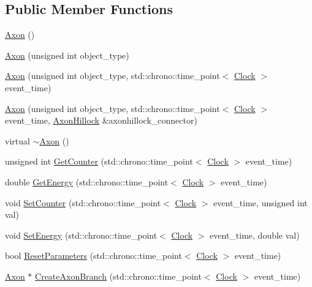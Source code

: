 \subsection*{Public Member Functions}
\begin{DoxyCompactItemize}
\item 
\hyperlink{class_axon_a1a0703b026b74c83e418613d929c5d22}{Axon} ()
\item 
\hyperlink{class_axon_a7cc05238af77735983111d1ca58c9c9b}{Axon} (unsigned int object\+\_\+type)
\item 
\hyperlink{class_axon_a0ca4cd87ad4a2719c6b7c8c3d46dcbc6}{Axon} (unsigned int object\+\_\+type, std\+::chrono\+::time\+\_\+point$<$ \hyperlink{universe_8h_a0ef8d951d1ca5ab3cfaf7ab4c7a6fd80}{Clock} $>$ event\+\_\+time)
\item 
\hyperlink{class_axon_afaffed720efb3cb75e46088c5fb81d95}{Axon} (unsigned int object\+\_\+type, std\+::chrono\+::time\+\_\+point$<$ \hyperlink{universe_8h_a0ef8d951d1ca5ab3cfaf7ab4c7a6fd80}{Clock} $>$ event\+\_\+time, \hyperlink{class_axon_hillock}{Axon\+Hillock} \&axonhillock\+\_\+connector)
\item 
virtual \hyperlink{class_axon_af000507f0ff0527d1743e90d2e756282}{$\sim$\+Axon} ()
\item 
unsigned int \hyperlink{class_axon_a390ff1f3d85034fc85bcafc7374da9c7}{Get\+Counter} (std\+::chrono\+::time\+\_\+point$<$ \hyperlink{universe_8h_a0ef8d951d1ca5ab3cfaf7ab4c7a6fd80}{Clock} $>$ event\+\_\+time)
\item 
double \hyperlink{class_axon_a37a1ca2b0454d77dc0bc93e493feb0ce}{Get\+Energy} (std\+::chrono\+::time\+\_\+point$<$ \hyperlink{universe_8h_a0ef8d951d1ca5ab3cfaf7ab4c7a6fd80}{Clock} $>$ event\+\_\+time)
\item 
void \hyperlink{class_axon_a3493cb97bde26bd66facc6084cd5f219}{Set\+Counter} (std\+::chrono\+::time\+\_\+point$<$ \hyperlink{universe_8h_a0ef8d951d1ca5ab3cfaf7ab4c7a6fd80}{Clock} $>$ event\+\_\+time, unsigned int val)
\item 
void \hyperlink{class_axon_af5108f451de97deb56138e8e81ced359}{Set\+Energy} (std\+::chrono\+::time\+\_\+point$<$ \hyperlink{universe_8h_a0ef8d951d1ca5ab3cfaf7ab4c7a6fd80}{Clock} $>$ event\+\_\+time, double val)
\item 
bool \hyperlink{class_axon_ae079e0b47f5027625da158930e4fa9c5}{Reset\+Parameters} (std\+::chrono\+::time\+\_\+point$<$ \hyperlink{universe_8h_a0ef8d951d1ca5ab3cfaf7ab4c7a6fd80}{Clock} $>$ event\+\_\+time)
\item 
\hyperlink{class_axon}{Axon} $\ast$ \hyperlink{class_axon_a41e97ead4c793003db2de87061574c26}{Create\+Axon\+Branch} (std\+::chrono\+::time\+\_\+point$<$ \hyperlink{universe_8h_a0ef8d951d1ca5ab3cfaf7ab4c7a6fd80}{Clock} $>$ event\+\_\+time)

\end{DoxyCompactItemize}
